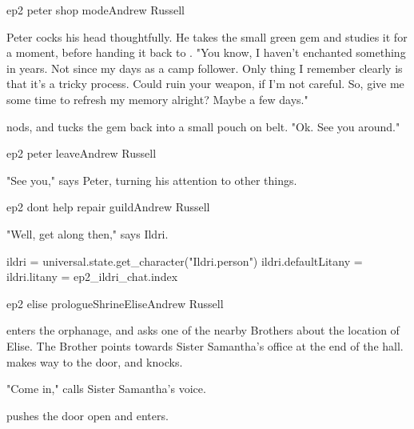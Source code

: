 \documentclass{book}
\begin{document}
\begin{childnode}{ep2 peter shop mode}{Andrew Russell}

    Peter cocks his head thoughtfully. He takes the small green gem and studies it for a moment, before handing it back to \name{}. "You know, I haven't enchanted something in years. Not since my 
    days as a camp follower. Only
    thing I remember clearly is that it's a tricky process. Could ruin your weapon, if I'm not careful. So, give me some time to refresh my memory alright? Maybe a few days."

    \name{} nods, and tucks the gem back into a small pouch on \hisher{} belt. "Ok. See you around."

\end{childnode}

\begin{childnode}{ep2 peter leave}{Andrew Russell}

    "See you," says Peter, turning his attention to other things.

\end{childnode}

\begin{childnode}{ep2 dont help repair guild}{Andrew Russell}

    "Well, get along then," says Ildri. 

    \begin{code}

        ildri = universal.state.get_character("Ildri.person")
        ildri.defaultLitany = ildri.litany = ep2_ildri_chat.index

    \end{code}

\end{childnode}

\begin{node}{ep2 elise prologue}{Shrine}{Elise}{Andrew Russell}


    \name{} enters the orphanage, and asks one of the nearby Brothers about the location of Elise. The Brother points towards Sister Samantha's office at the end of the hall. \name{} makes \hisher{} way to the 
    door, and knocks.

    "Come in," calls Sister Samantha's voice.

    \name{} pushes the door open and enters.



\end{node}
\end{document}
